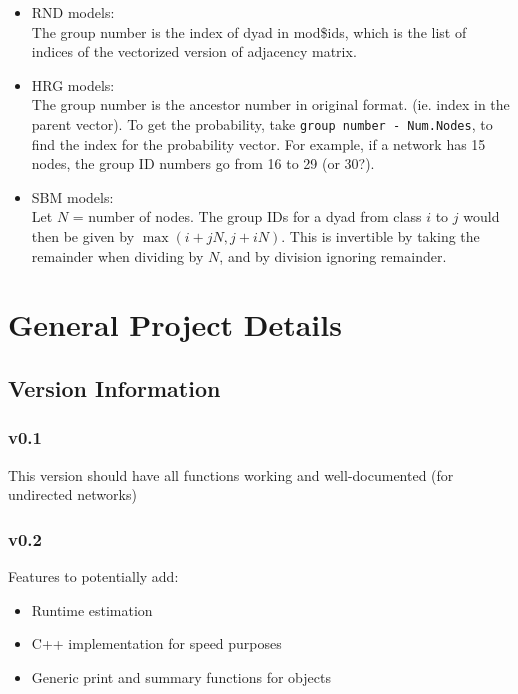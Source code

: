 \documentclass[11pt]{article}
\begin{document}
\begin{itemize}
\item RND models: \\
The group number is the index of dyad in mod\$ids, which is the list of indices of the vectorized version of adjacency matrix. 

\item HRG models: \\
The group number is the ancestor number in original format. (ie. index in the parent vector). To get the probability, take \texttt{group number - Num.Nodes}, to find the index for the probability vector. For example, if a network has 15 nodes, the group ID numbers go from 16 to 29 (or 30?). 

\item SBM models: \\
Let $N$ = number of nodes. The group IDs for a dyad from class $i$ to $j$ would then be given by $\max(i + jN, j + iN)$. This is invertible by taking the remainder when dividing by $N$, and by division ignoring remainder. 

\end{itemize}






\pagebreak
\section{General Project Details}
\subsection{Version Information}
\subsubsection{v0.1}
This version should have all functions working and well-documented
(for undirected networks)

\subsubsection{v0.2}
Features to potentially add: 
\begin{itemize}
\item Runtime estimation
\item C++ implementation for speed purposes
\item Generic print and summary functions for objects
\end{itemize}
\end{document}
